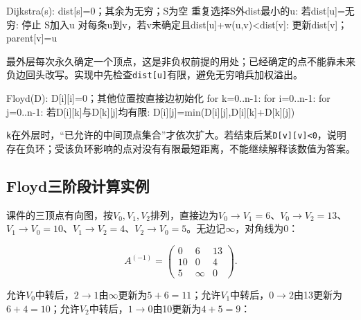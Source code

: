 \par\medskip\noindent\begin{minipage}{\linewidth}
\begin{codeblock}[language={}]
Dijkstra(s):
    dist[s]=0；其余为无穷；S为空
    重复选择S外dist最小的u:
        若dist[u]=无穷: 停止
        S加入u
        对每条u到v，若v未确定且dist[u]+w(u,v)<dist[v]:
            更新dist[v]；parent[v]=u
\end{codeblock}
\end{minipage}\par\medskip

最外层每次永久确定一个顶点，这是非负权前提的用处；已经确定的点不能靠未来负边回头改写。实现中先检查\texttt{dist[\allowbreak{}u]\allowbreak{}}有限，避免无穷哨兵加权溢出。

\par\medskip\noindent\begin{minipage}{\linewidth}
\begin{codeblock}[language={}]
Floyd(D):
    D[i][i]=0；其他位置按直接边初始化
    for k=0..n-1:
        for i=0..n-1:
            for j=0..n-1:
                若D[i][k]与D[k][j]均有限:
                    D[i][j]=min(D[i][j],D[i][k]+D[k][j])
\end{codeblock}
\end{minipage}\par\medskip

\texttt{k}在外层时，``已允许的中间顶点集合''才依次扩大。若结束后某\texttt{D[\allowbreak{}v]\allowbreak{}[\allowbreak{}v]\allowbreak{}<\allowbreak{}0}，说明存在负环；受该负环影响的点对没有有限最短距离，不能继续解释该数值为答案。

\subsection{Floyd三阶段计算实例}\label{DS06-floyd-example}

课件的三顶点有向图，按\(V_0,V_1,V_2\)排列，直接边为\(V_0\to V_1=6\)、\(V_0\to V_2=13\)、\(V_1\to V_0=10\)、\(V_1\to V_2=4\)、\(V_2\to V_0=5\)。无边记\(\infty\)，对角线为0：

\[
A^{(-1)}=\begin{pmatrix}0&6&13\\10&0&4\\5&\infty&0\end{pmatrix}.
\]

允许\(V_0\)中转后，\(2\to1\)由\(\infty\)更新为\(5+6=11\)；允许\(V_1\)中转后，\(0\to2\)由13更新为\(6+4=10\)；允许\(V_2\)中转后，\(1\to0\)由10更新为\(4+5=9\)：

